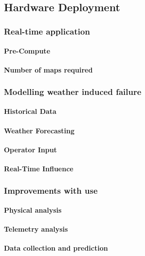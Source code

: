 \subsection{Hardware Deployment}

\subsubsection{Real-time application}
\paragraph{Pre-Compute}
\paragraph{Number of maps required}

\subsubsection{Modelling weather induced failure}
\paragraph{Historical Data}
\paragraph{Weather Forecasting}
\paragraph{Operator Input}
\paragraph{Real-Time Influence}

\subsubsection{Improvements with use}
\paragraph{Physical analysis}
\paragraph{Telemetry analysis}
\paragraph{Data collection and prediction}
